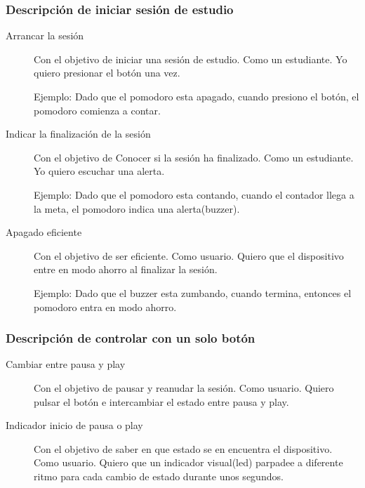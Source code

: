 \documentclass{article}
\begin{document}
\subsubsection{Descripción de iniciar sesión de estudio}
\begin{description}
	\item [Arrancar la sesión] Con el objetivo de iniciar una sesión de 
		estudio. Como un estudiante. Yo quiero presionar el botón una
		vez.

		\CheckedBox Ejemplo: Dado que el pomodoro esta apagado, cuando 
		presiono el
		botón, el pomodoro comienza a contar.
	
	\item [Indicar la finalización de la sesión] Con el objetivo de Conocer
		si la sesión ha finalizado. Como un estudiante. Yo quiero 
		escuchar una alerta.

		\CheckedBox Ejemplo: Dado que el pomodoro esta contando, cuando 
		el contador
		llega a la meta, el pomodoro indica una alerta(buzzer).

	\item [Apagado eficiente] Con el objetivo de ser eficiente. 
		Como usuario. Quiero que el dispositivo entre en modo ahorro
		al finalizar la sesión.

		\Square Ejemplo: Dado que el buzzer esta zumbando, cuando 
		termina, entonces el pomodoro entra en modo ahorro.
\end{description}
\subsubsection{Descripción de controlar con un solo botón}
\begin{description}
	\item[Cambiar entre pausa y play] Con el objetivo de pausar y reanudar
		la sesión. Como usuario. Quiero pulsar el botón e intercambiar
		el estado entre pausa y play.

	\item[Indicador inicio de pausa o play] Con el objetivo de saber en que
		estado se en encuentra el dispositivo. Como usuario. Quiero que
		un indicador visual(led) parpadee a diferente ritmo para cada 
		cambio de estado durante unos segundos.
\end{description}
\end{document}

